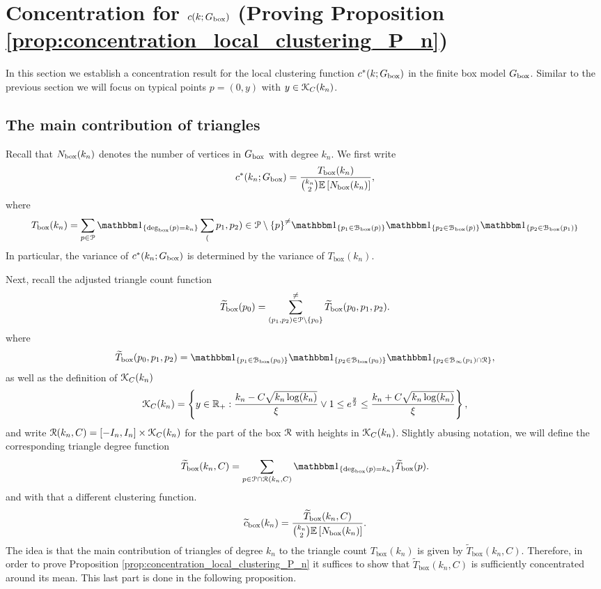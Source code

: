 \section{Concentration for $c(k; G_{\mathrm{box}})$ (Proving Proposition \ref{prop:concentration_local_clustering_P_n})}
\label{sec:concentration_c_P_n}

In this section we establish a concentration result for the local clustering function $c^\ast(k; G_{\mathrm{box}})$ in the finite box model $G_{\mathrm{box}}$. Similar to the previous section we will focus on typical points $p = (0,y)$ with $y \in {\mathcal K}_{C}(k_n)$. 

\subsection{The main contribution of triangles}

Recall that $N_{\text{box}}(k_n)$ denotes the number of vertices in $G_{\mathrm{box}}$ with degree $k_n$. We first write
\[
	c^\ast(k_n ; G_{\mathrm{box}}) = \frac{T_{\text{box}}(k_n)}{\binom{k_n}{2}\mathbb{E}\left[N_{\text{box}}(k_n)\right]},
\]
where
\[
	 T_{\text{box}}(k_n) = \sum_{p \in \Pcal} \ind{\Dbox(p) = k_n} \sum_({p_1, p_2) \in \Pcal \setminus \{p\}}^{\ne} 
	 \ind{p_1 \in \BallPon{p}}\ind{p_2 \in \BallPon{p}}\ind{p_2 \in \BallPon{p_1}}
\]
In particular, the variance of $c^\ast(k_n ; G_{\mathrm{box}})$ is determined by the variance of $T_{\text{box}}(k_n)$.

Next, recall the adjusted triangle count function
\[
	\widetilde{T}_{\text{box}}(p_0) = \sum_{(p_1, p_2) \in {\mathcal P} \setminus \{p_0\}}^{\ne} 
		\widetilde{T}_{\text{box}}(p_0,p_1,p_2).
\]
where
\[
	\widetilde{T}_{\text{box}}(p_0,p_1,p_2) = \ind{p_1 \in \BallPon{p_0}}\ind{p_2 \in \BallPon{p_0}}\ind{p_2 \in \BallPo{p_1} \cap \Rcal},
\]
as well as the definition of ${\mathcal K}_{C}(k_n)$
\[
	{\mathcal K}_{C}(k_n) = \left\{y \in {\ensuremath{\mathbb R}}_+ : \frac{k_n - C \sqrt{k_n \log(k_n)}}{\xi} \vee 1 \le e^{\frac{y}{2}}
		\le \frac{k_n + C \sqrt{k_n \log(k_n)}}{\xi} \right\},
\]
and write ${\mathcal R}(k_n,C) = [-I_n,I_n] \times {\mathcal K}_{C}(k_n)$ for the part of the box ${\mathcal R}$ with heights in ${\mathcal K}_{C}(k_n)$.
Slightly abusing notation, we will define the corresponding triangle degree function
\begin{equation}\label{eq:def_degree_triangle_count_in_K}
	\widetilde{T}_{\text{box}}(k_n, C) = \sum_{p \in \Pcal \cap \Rcal(k_n,C)} \ind{\text{deg}_{\text{box}}(p) = k_n} \widetilde{T}_{\text{box}}(p).
\end{equation}
and with that a different clustering function.
\begin{equation}\label{eq:def_tilde_c_box}
	\widetilde{c}_{\text{box}}(k_n) = \frac{\widetilde{T}_{\text{box}}(k_n,C)}{\binom{k_n}{2}\mathbb{E}\left[N_{\text{box}}(k_n)\right]}.
\end{equation}
The idea is that the main contribution of triangles of degree $k_n$ to the triangle count $T_{\text{box}}(k_n)$ is given by $\widetilde{T}_{\text{box}}(k_n, C)$. Therefore, in order to prove Proposition \ref{prop:concentration_local_clustering_P_n} it suffices to show that $\widetilde{T}_{\text{box}}(k_n,C)$ is sufficiently concentrated around its mean. This last part is done in the following proposition.

